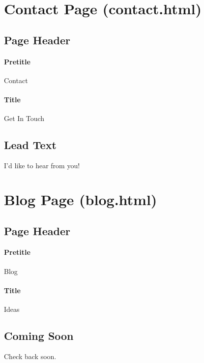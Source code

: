 \documentclass[11pt]{article}
\begin{document}
\section{Contact Page (contact.html)}

\subsection{Page Header}
\label{sec:contact-header}

\paragraph{Pretitle}
Contact

\paragraph{Title}
Get In Touch

\subsection{Lead Text}
\label{sec:contact-lead}
 I'd like to hear from you!


\section{Blog Page (blog.html)}

\subsection{Page Header}
\label{sec:blog-header}

\paragraph{Pretitle}
Blog

\paragraph{Title}
Ideas

\subsection{Coming Soon}
\label{sec:blog-coming-soon}
Check back soon.
\end{document}
